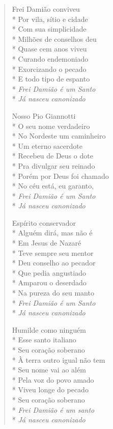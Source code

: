 \begin{verse}
Frei Damião conviveu\\*
Por vila, sítio e cidade\\*
Com sua simplicidade\\*
Milhões de conselhos deu\\*
Quase cem anos viveu\\*
Curando endemoniado\\*
Exorcizando o pecado\\*
E todo tipo de espanto\\*
\textit{Frei Damião é um Santo}\\*
\textit{Já nasceu canonizado}

Nosso Pio Giannotti\\*
O seu nome verdadeiro\\*
No Nordeste um caminheiro\\*
Um eterno sacerdote\\*
Recebeu de Deus o dote\\*
Pra divulgar seu reinado\\*
Porém por Deus foi chamado\\*
No céu está, eu garanto,\\*
\textit{Frei Damião é um Santo}\\*
\textit{Já nasceu canonizado}

Espírito conservador\\*
Alguém dirá, mas não é\\*
Em Jesus de Nazaré\\*
Teve sempre seu mentor\\*
Deu conselho ao pecador\\*
Que pedia angustiado\\*
Amparou o deserdado\\*
Na pureza do seu manto\\*
\textit{Frei Damião é um Santo}\\*
\textit{Já nasceu canonizado}

Humilde como ninguém\\*
Esse santo italiano\\*
Seu coração soberano\\*
À terra outro igual não tem\\*
Seu nome vai ao além\\*
Pela voz do povo amado\\*
Viveu longe do pecado\\*
Seu coração soberano\\*
\textit{Frei Damião é um santo}\\*
\textit{Já nasceu canonizado}


\end{verse}
